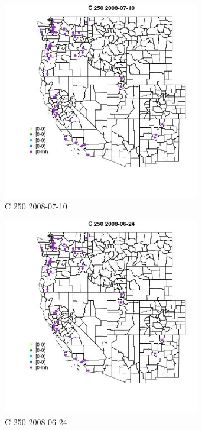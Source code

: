 \begin{figure} 
\centering  
\includegraphics[width=0.77\textwidth]{Code_Outputs/Report_ML_input_PM25_Step4_part_e_de_duplicated_aves_MapObsC_2502008-07-10.jpg} 
\caption{\label{fig:Report_ML_input_PM25_Step4_part_e_de_duplicated_avesMapObsC_2502008-07-10}C 250 2008-07-10} 
\end{figure} 
 

\begin{figure} 
\centering  
\includegraphics[width=0.77\textwidth]{Code_Outputs/Report_ML_input_PM25_Step4_part_e_de_duplicated_aves_MapObsC_2502008-06-24.jpg} 
\caption{\label{fig:Report_ML_input_PM25_Step4_part_e_de_duplicated_avesMapObsC_2502008-06-24}C 250 2008-06-24} 
\end{figure} 
 

